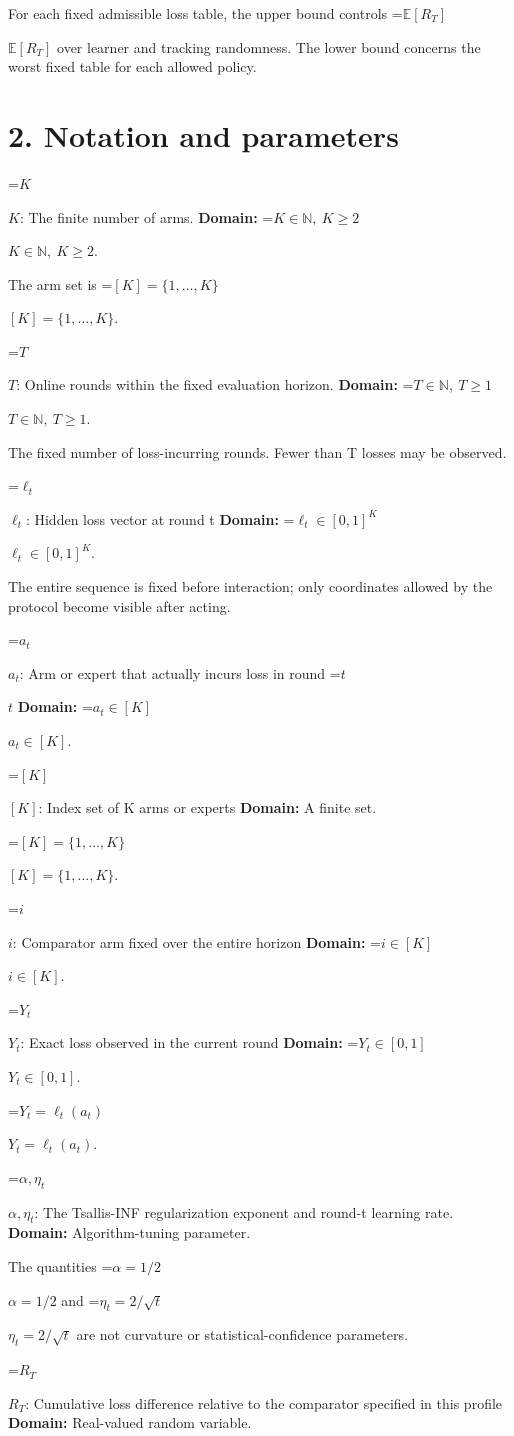 \documentclass[10pt,a4paper]{article}
\newcommand{\AtlasMath}[1]{\par\begingroup\centering\setbox0=\hbox{$\displaystyle #1$}\ifdim\wd0>1.4\linewidth\typeout{ATLAS WIDE FORMULA: \the\wd0}\fi\ifdim\wd0>\linewidth\resizebox{\linewidth}{!}{\box0}\else\box0\fi\par\endgroup}
\newcommand{\AtlasInlineMath}[1]{\begingroup\setbox0=\hbox{$#1$}\ifdim\wd0>.4\linewidth\endgroup\AtlasMath{#1}\else\endgroup$#1$\fi}
\begin{document}
For each fixed admissible loss table, the upper bound controls \AtlasInlineMath{\mathbb E[R_T]} over learner and tracking randomness. The lower bound concerns the worst fixed table for each allowed policy.

\section{2. Notation and parameters}
\AtlasInlineMath{K}: The finite number of arms. \textbf{Domain:} \AtlasInlineMath{K\in\mathbb N,\ K\ge2}.

The arm set is \AtlasInlineMath{[K]=\{1,\ldots,K\}}.

\AtlasInlineMath{T}: Online rounds within the fixed evaluation horizon. \textbf{Domain:} \AtlasInlineMath{T\in\mathbb N,\ T\ge1}.

The fixed number of loss-incurring rounds. Fewer than T losses may be observed.

\AtlasInlineMath{\ell_t}: Hidden loss vector at round t \textbf{Domain:} \AtlasInlineMath{\ell_t\in[0,1]^K}.

The entire sequence is fixed before interaction; only coordinates allowed by the protocol become visible after acting.

\AtlasInlineMath{a_t}: Arm or expert that actually incurs loss in round \AtlasInlineMath{t} \textbf{Domain:} \AtlasInlineMath{a_t\in[K]}.

\AtlasInlineMath{[K]}: Index set of K arms or experts \textbf{Domain:} A finite set.

\AtlasInlineMath{[K]=\{1,\ldots,K\}}.

\AtlasInlineMath{i}: Comparator arm fixed over the entire horizon \textbf{Domain:} \AtlasInlineMath{i\in[K]}.

\AtlasInlineMath{Y_t}: Exact loss observed in the current round \textbf{Domain:} \AtlasInlineMath{Y_t\in[0,1]}.

\AtlasInlineMath{Y_t=\ell_t(a_t)}.

\AtlasInlineMath{\alpha,\eta_t}: The Tsallis-INF regularization exponent and round-t learning rate. \textbf{Domain:} Algorithm-tuning parameter.

The quantities \AtlasInlineMath{\alpha=1/2} and \AtlasInlineMath{\eta_t=2/\sqrt t} are not curvature or statistical-confidence parameters.

\AtlasInlineMath{R_T}: Cumulative loss difference relative to the comparator specified in this profile \textbf{Domain:} Real-valued random variable.
\end{document}
